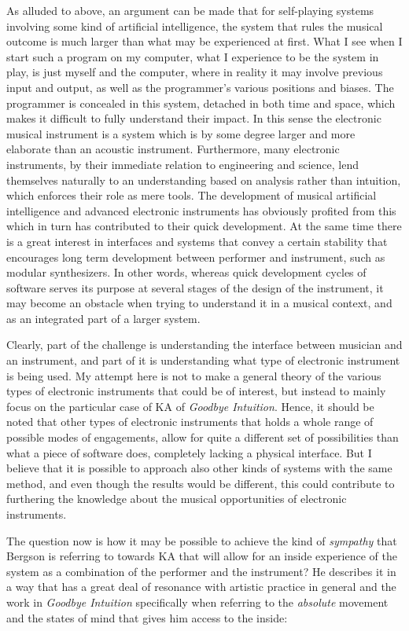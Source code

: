 \documentclass[11pt]{article}
\begin{document}
As alluded to above, an argument can be made that for self-playing systems involving some kind of artificial intelligence, the system that rules the musical outcome is much larger than what may be experienced at first. What I see when I start such a program on my computer, what I experience to be the system in play, is just myself and the computer, where in reality it may involve previous input and output, as well as the programmer's various positions and biases. The programmer is concealed in this system, detached in both time and space, which makes it difficult to fully understand their impact. In this sense the electronic musical instrument is a system which is by some degree larger and more elaborate than an acoustic instrument. Furthermore, many electronic instruments, by their immediate relation to engineering and science, lend themselves naturally to an understanding based on analysis rather than intuition, which enforces their role as mere tools. The development of musical artificial intelligence and advanced electronic instruments has obviously profited from this which in turn has contributed to their quick development. At the same time there is a great interest in interfaces and systems that convey a certain stability that encourages long term development between performer and instrument, such as modular synthesizers. In other words, whereas quick development cycles of software serves its purpose at several stages of the design of the instrument, it may become an obstacle when trying to understand it in a musical context, and as an integrated part of a larger system.

Clearly, part of the challenge is understanding the interface between musician and an instrument, and part of it is understanding what type of electronic instrument is being used. My attempt here is not to make a general theory of the various types of electronic instruments that could be of interest, but instead to mainly focus on the particular case of KA of \emph{Goodbye Intuition}. Hence, it should be noted that other types of electronic instruments that holds a whole range of possible modes of engagements, allow for quite a different set of possibilities than what a piece of software does, completely lacking a physical interface. But I believe that it is possible to approach also other kinds of systems with the same method, and even though the results would be different, this could contribute to furthering the knowledge about the musical opportunities of electronic instruments.

The question now is how it may be possible to achieve the kind of \emph{sympathy} that Bergson is referring to towards KA that will allow for an inside experience of the system as a combination of the performer and the instrument? He describes it in a way that has a great deal of resonance with artistic practice in general and the work in \emph{Goodbye Intuition} specifically when referring to the \emph{absolute} movement and the states of mind that gives him access to the inside:
\end{document}
